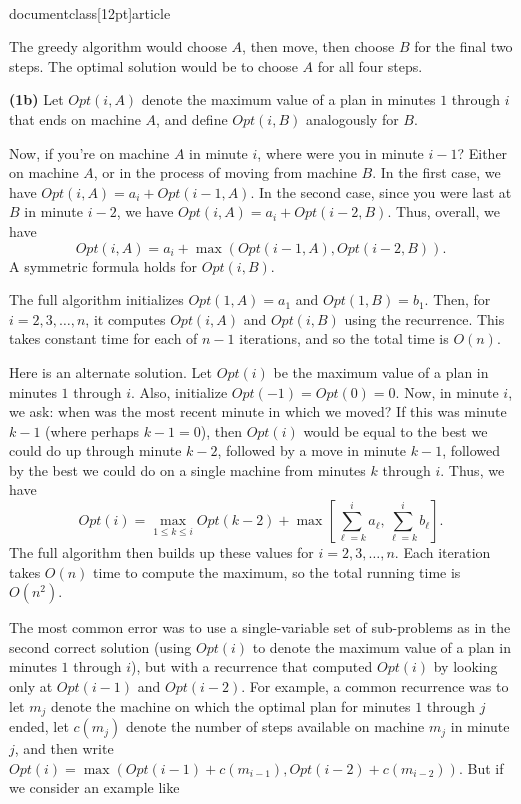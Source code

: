 \\documentclass[12pt]{article}
\begin{document}
\begin{enumerate}
{The greedy algorithm would choose $A$, then move, 
then choose $B$ for the final two steps.
The optimal solution would be to choose $A$ for
all four steps.

\medskip

{\bf (1b)} 
Let $Opt(i,A)$ denote the maximum value of a plan in minutes
$1$ through $i$ that ends on machine $A$,
and define $Opt(i,B)$ analogously for $B$.

Now, if you're on machine $A$ in minute $i$, where
were you in minute $i-1$?
Either on machine $A$, or in the process of moving from machine $B$.
In the first case, we have
$Opt(i,A) = a_i + Opt(i-1,A)$.
In the second case, since you were last at $B$ in minute $i-2$, we have
$Opt(i,A) = a_i + Opt(i-2,B)$.
Thus, overall, we have
$$Opt(i,A) = a_i + \max(Opt(i-1,A), Opt(i-2,B)).$$
A symmetric formula holds for $Opt(i,B)$.

The full algorithm initializes $Opt(1,A) = a_1$ and $Opt(1,B) = b_1$.
Then, for $i = 2, 3, \ldots, n$, it computes 
$Opt(i,A)$ and $Opt(i,B)$ using the recurrence.
This takes constant time for each of $n-1$ iterations,
and so the total time is $O(n)$.

Here is an alternate solution. 
Let $Opt(i)$ be the maximum value 
of a plan in minutes $1$ through $i$.
Also, initialize $Opt(-1) = Opt(0) = 0$.
Now, in minute $i$, we ask: when was the most recent minute 
in which we moved?
If this was minute $k-1$ (where perhaps $k-1 = 0$),
then $Opt(i)$ would be equal to the best we could do
up through minute $k-2$, followed by a move in minute $k-1$,
followed by the best we could do on a single machine from
minutes $k$ through $i$.  
Thus, we have 
$$Opt(i) = \max_{1 \leq k \leq i} Opt(k-2) + 
\max\left[\sum_{\ell=k}^i a_\ell , \sum_{\ell=k}^i b_\ell\right].$$
The full algorithm then builds up these values 
for $i = 2, 3, \ldots, n$.
Each iteration takes $O(n)$ time to compute the maximum,
so the total running time is $O(n^2)$.

\medskip
The most common error was to use a single-variable set of
sub-problems as in the second correct solution 
(using $Opt(i)$ to denote the maximum value
of a plan in minutes $1$ through $i$),
but with a recurrence that computed $Opt(i)$ by
looking only at $Opt(i-1)$ and $Opt(i-2)$.
For example, a common recurrence was to let $m_j$
denote the machine on which the optimal plan
for minutes $1$ through $j$ ended,
let $c(m_j)$ denote the number of steps
available on machine $m_j$ in minute $j$,
and then write
$Opt(i) = \max(Opt(i-1) + c(m_{i-1}), Opt(i-2) + c(m_{i-2}))$.
But if we consider an example like

}
\end{enumerate}
\end{document}
